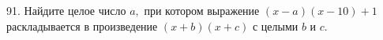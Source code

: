 91. Найдите целое число  $a,$ при котором выражение  $(x-a)(x-10)+1$ раскладывается в произведение $(x+b)(x+c)$ с целыми  $b$ и  $c.$\\
